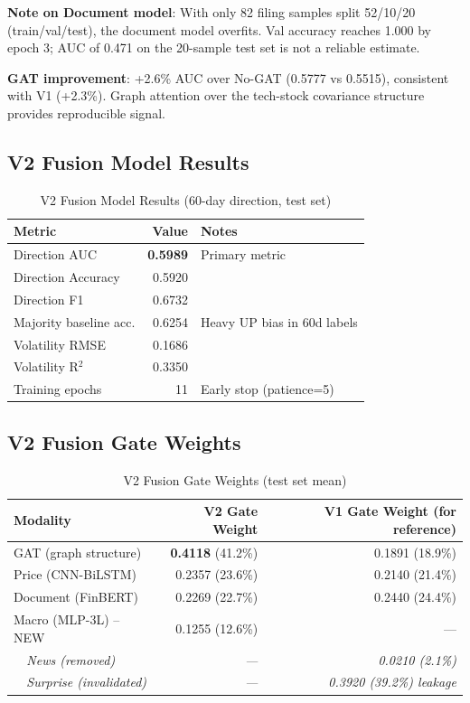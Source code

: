 \documentclass[12pt,a4paper]{article}
\begin{document}
\noindent \textbf{Note on Document model}: With only 82 filing samples split 52/10/20
(train/val/test), the document model overfits. Val accuracy reaches 1.000 by epoch 3;
AUC of 0.471 on the 20-sample test set is not a reliable estimate.

\noindent \textbf{GAT improvement}: +2.6\% AUC over No-GAT (0.5777 vs 0.5515),
consistent with V1 (+2.3\%). Graph attention over the tech-stock covariance structure
provides reproducible signal.

\subsection{V2 Fusion Model Results}

\begin{table}[H]
\centering
\caption{V2 Fusion Model Results (60-day direction, test set)}
\begin{tabular}{lrl}
\toprule
\textbf{Metric} & \textbf{Value} & \textbf{Notes} \\
\midrule
Direction AUC          & \textbf{0.5989} & Primary metric \\
Direction Accuracy     & 0.5920 & \\
Direction F1           & 0.6732 & \\
Majority baseline acc. & 0.6254 & Heavy UP bias in 60d labels \\
Volatility RMSE        & 0.1686 & \\
Volatility R$^2$       & 0.3350 & \\
Training epochs        & 11     & Early stop (patience=5) \\
\bottomrule
\end{tabular}
\end{table}

\subsection{V2 Fusion Gate Weights}

\begin{table}[H]
\centering
\caption{V2 Fusion Gate Weights (test set mean)}
\begin{tabular}{lrr}
\toprule
\textbf{Modality} & \textbf{V2 Gate Weight} & \textbf{V1 Gate Weight (for reference)} \\
\midrule
GAT (graph structure) & \textbf{0.4118} (41.2\%) & 0.1891 (18.9\%) \\
Price (CNN-BiLSTM)    & 0.2357 (23.6\%) & 0.2140 (21.4\%) \\
Document (FinBERT)    & 0.2269 (22.7\%) & 0.2440 (24.4\%) \\
Macro (MLP-3L) -- NEW & 0.1255 (12.6\%) & --- \\
\textit{~~News (removed)}      & \textit{---}    & \textit{0.0210 (2.1\%)} \\
\textit{~~Surprise (invalidated)} & \textit{---} & \textit{0.3920 (39.2\%) leakage} \\
\bottomrule
\end{tabular}
\end{table}
\end{document}

